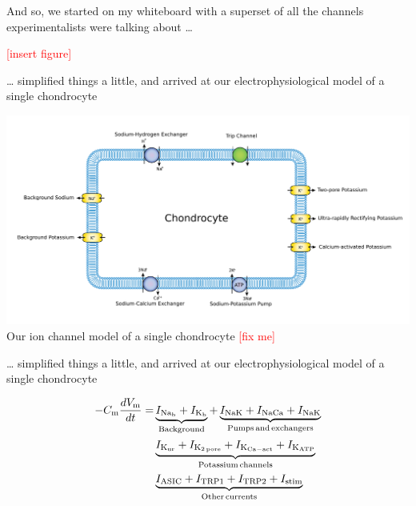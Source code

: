 \documentclass[ignorenonframetext]{beamer}
\newcommand{\addfigure} {
  \scriptsize
  \textcolor{red}{[insert figure]}
  \normalsize
}
\newcommand{\fixme} {
  \scriptsize
  \textcolor{red}{[fix me]}
  \normalsize
}
\begin{document}

\begin{frame}{And so, we started on my whiteboard with a superset of
    all the channels experimentalists were talking about \ldots}

  \addfigure

\end{frame}

%
%

\begin{frame}{\ldots{} simplified things a little, and arrived at our
    electrophysiological model of a single chondrocyte}

  \begin{center}
    \includegraphics[width=\textwidth]{../images/pdf/chondrocyte-model-cellml}
    {\\[-0.1cm] \scriptsize Our ion channel model of a single chondrocyte \fixme}
  \end{center}

\end{frame}


\begin{frame}{\ldots{} simplified things a little, and arrived at our
    electrophysiological model of a single chondrocyte}

  \begin{equation*}
    \begin{split}
      -C_{\rm m} \frac{dV_{\rm m}}{dt} = & \underbrace{I_{\rm Na_b} + I_{\rm K_b}}_{\rm Background} +
      \underbrace{I_{\rm NaK} + I_{\rm NaCa} + I_{\rm NaK}}_{\rm Pumps\, and\, exchangers}\\
      & \underbrace{I_{\rm K_{ur}} + I_{\rm K_{2\, pore}} + I_{\rm K_{Ca-act}} + I_{\rm K_{ATP}}}_{\rm Potassium\, channels}\\
      & \underbrace{I_{\rm ASIC} + I_{\rm TRP1} + I_{\rm TRP2} + I_{\rm stim}}_{\rm Other\, currents}
    \end{split}
  \end{equation*}

\end{frame}
\end{document}
